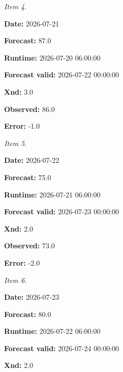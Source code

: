 \documentclass[11pt]{article}
\begin{document}
\par\noindent\textit{Item 4.}\par \par\noindent\textbf{Date:} 2026-07-21

\par\noindent\textbf{Forecast:} 87.0

\par\noindent\textbf{Runtime:} 2026-07-20 06:00:00

\par\noindent\textbf{Forecast valid:} 2026-07-22 00:00:00

\par\noindent\textbf{Xnd:} 3.0

\par\noindent\textbf{Observed:} 86.0

\par\noindent\textbf{Error:} -1.0

\par\noindent\textit{Item 5.}\par \par\noindent\textbf{Date:} 2026-07-22

\par\noindent\textbf{Forecast:} 75.0

\par\noindent\textbf{Runtime:} 2026-07-21 06:00:00

\par\noindent\textbf{Forecast valid:} 2026-07-23 00:00:00

\par\noindent\textbf{Xnd:} 2.0

\par\noindent\textbf{Observed:} 73.0

\par\noindent\textbf{Error:} -2.0

\par\noindent\textit{Item 6.}\par \par\noindent\textbf{Date:} 2026-07-23

\par\noindent\textbf{Forecast:} 80.0

\par\noindent\textbf{Runtime:} 2026-07-22 06:00:00

\par\noindent\textbf{Forecast valid:} 2026-07-24 00:00:00

\par\noindent\textbf{Xnd:} 2.0
\end{document}
